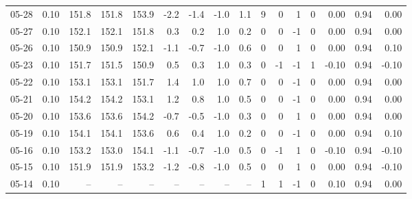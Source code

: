 \begin{threeparttable}
{\begin{tabular}{lrrrrrrrrrrrrrrr}
  05-28 &     0.10 & 151.8 & 151.8 & 153.9 &       -2.2 &           -1.4 &                     -1.0 &                 1.1 &              9 &         0 &     1 &         0 &       0.00 &      0.94 &           0.00 \\
  05-27 &     0.10 & 152.1 & 152.1 & 151.8 &        0.3 &            0.2 &                      1.0 &                 0.2 &              0 &         0 &    -1 &         0 &       0.00 &      0.94 &           0.00 \\
  05-26 &     0.10 & 150.9 & 150.9 & 152.1 &       -1.1 &           -0.7 &                     -1.0 &                 0.6 &              0 &         0 &     1 &         0 &       0.00 &      0.94 &           0.10 \\
  05-23 &     0.10 & 151.7 & 151.5 & 150.9 &        0.5 &            0.3 &                      1.0 &                 0.3 &              0 &        -1 &    -1 &         1 &      -0.10 &      0.94 &          -0.10 \\
  05-22 &     0.10 & 153.1 & 153.1 & 151.7 &        1.4 &            1.0 &                      1.0 &                 0.7 &              0 &         0 &    -1 &         0 &       0.00 &      0.94 &           0.00 \\
  05-21 &     0.10 & 154.2 & 154.2 & 153.1 &        1.2 &            0.8 &                      1.0 &                 0.5 &              0 &         0 &    -1 &         0 &       0.00 &      0.94 &           0.00 \\
  05-20 &     0.10 & 153.6 & 153.6 & 154.2 &       -0.7 &           -0.5 &                     -1.0 &                 0.3 &              0 &         0 &     1 &         0 &       0.00 &      0.94 &           0.00 \\
  05-19 &     0.10 & 154.1 & 154.1 & 153.6 &        0.6 &            0.4 &                      1.0 &                 0.2 &              0 &         0 &    -1 &         0 &       0.00 &      0.94 &           0.10 \\
  05-16 &     0.10 & 153.2 & 153.0 & 154.1 &       -1.1 &           -0.7 &                     -1.0 &                 0.5 &              0 &        -1 &     1 &         0 &      -0.10 &      0.94 &          -0.10 \\
  05-15 &     0.10 & 151.9 & 151.9 & 153.2 &       -1.2 &           -0.8 &                     -1.0 &                 0.5 &              0 &         0 &     1 &         0 &       0.00 &      0.94 &          -0.10 \\
  05-14 &     0.10 &    -- &    -- &    -- &         -- &             -- &                       -- &                  -- &              1 &         1 &    -1 &         0 &       0.10 &      0.94 &           0.00 \\

\end{tabular}}
\end{threeparttable}
